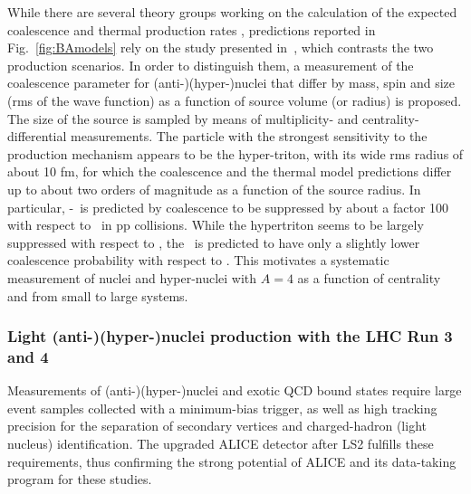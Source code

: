 While there are several theory groups working on the calculation of the expected coalescence \cite{Scheibl:1998tk, Cho:2017dcy, Zhang:2018euf, Bazak:2018hgl, Zhao:2018lyf} and thermal production rates \cite{Andronic:2010qu, Wheaton:2004qb, Petran:2013dva}, predictions reported in Fig.~\ref{fig:BAmodels} rely on the study presented in~\cite{Bellini:2018epz}, which contrasts the two production scenarios. 
In order to distinguish them, a measurement of the coalescence parameter for (anti-)(hyper-)nuclei that differ by mass, spin and size (rms of the wave function) as a function of source volume (or radius) is proposed. The size of the source is sampled by means of multiplicity- and centrality-differential measurements.
The particle with the strongest sensitivity to the production mechanism appears to be the hyper-triton, with its wide rms radius of about 10 fm, for which the coalescence and the thermal model predictions differ up to about two orders of magnitude as a function of the source radius. 
In particular, \hyp~is predicted by coalescence to be suppressed by about a factor 100 with respect to \hethree~in pp collisions. 
While the hypertriton seems to be largely suppressed with respect to \hethree, the \hypfour\ is predicted to have only a slightly lower coalescence probability with respect to \hefour. This motivates a systematic measurement of nuclei and hyper-nuclei with $A=4$ as a function of centrality and from small to large systems.

\subsubsection{Light (anti-)(hyper-)nuclei production with the LHC Run 3 and 4}
\label{sec:hyper}
Measurements of (anti-)(hyper-)nuclei and exotic QCD bound states require large event samples collected with a minimum-bias trigger, as well as high tracking precision for the separation of secondary vertices and charged-hadron (light nucleus) identification. The upgraded ALICE detector after LS2 \cite{Abelevetal:2014dna, ALICE:2014qrd,alice-up-trg,Buncic:2015ari} fulfills these requirements, thus confirming the strong potential of ALICE and its data-taking program for these studies.

